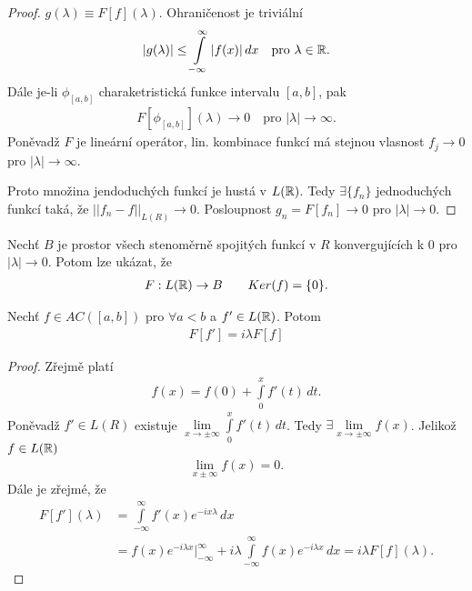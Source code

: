 \begin{proof}
$g(\lambda) \equiv F[f](\lambda)$. Ohraničenost je triviální
\begin{align*}
|g(\lambda)| \leq \int \limits _{-\infty}^{\infty} |f(x)| \, dx \quad \text{pro $\lambda \in \mathbb{R}$.}
\end{align*}
Dále je-li $\phi_{[a,b]}$ charaketristická funkce intervalu $[a,b]$, pak 
\begin{align}
F[\phi_{[a,b]}](\lambda) \to 0 \quad \text{pro $|\lambda| \to \infty$.}
\end{align}
Poněvadž $F$ je lineární operátor, lin. kombinace funkcí má stejnou vlasnost $f_j \to 0$ pro $|\lambda| \to \infty$. 

Proto množina jendoduchých funkcí je hustá v $L(\mathbb{R})$. Tedy $\exists \{f_n\}$ jednoduchých funkcí taká, že $||f_n-f||_{L(R)} \to 0$. Posloupnost $g_n=F[f_n] \to 0$ pro $|\lambda | \to 0$. 
\end{proof}
\begin{poznamka}
Nechť $B$ je prostor všech stenoměrně spojitých funkcí v $R$ konvergujících k $0$ pro $|\lambda| \to 0$. Potom lze ukázat, že 
\begin{align*}
F:L(\mathbb{R}) \to B \qquad Ker(f)=\{0\}.
\end{align*}
\end{poznamka}

\begin{tvrz}\label{t_6.10}
Nechť $f \in AC([a,b])$ pro $\forall a<b$ a $f' \in L(\mathbb{R})$. Potom
\begin{align*}
F[f']=i \lambda F[f]
\end{align*}
\end{tvrz}


\begin{proof}
Zřejmě platí
\begin{align*}
f(x)=f(0)+\int \limits _0^x f'(t) \, dt.
\end{align*}
Poněvadž $f' \in L(R)$ existuje $\lim \limits _{x \to \pm \infty} \int \limits _0^xf'(t) \, dt$. Tedy $\exists \lim \limits _{x \to \pm \infty} f(x) $. Jelikož $f \in L(\mathbb{R})$ 
\begin{align*}
\lim \limits _{x \pm \infty} f(x)=0.
\end{align*}
Dále je zřejmé, že 
\begin{align*}
F[f'](\lambda)&=\int \limits _{-\infty}^{\infty}f'(x) e^{-ix \lambda} \, dx \\
&= f(x) e^{-i \lambda x} \big |  _{-\infty}^{\infty} + i \lambda \int \limits _{-\infty}^{\infty} f(x) e^{-i \lambda x} \, dx = i \lambda F[f](\lambda). 
\end{align*}
\end{proof}

